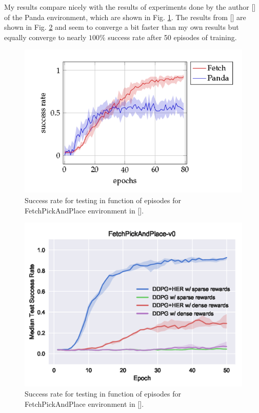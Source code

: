 \documentclass[conference]{IEEEtran}
\begin{document}
My results compare nicely with the results of experiments done by the author [\cite{gallouedec2021multi}] of the Panda environment, which are shown in Fig. \ref{fig:exp_deep_test_gallouedec}. The results from [\cite{plappert2018multi}] are shown in Fig. \ref{fig:exp_deep_test_plappert} and seem to converge a bit faster than my own results but equally converge to nearly $100\%$ success rate after 50 episodes of training.
\begin{figure}[ht]
\centering
\includegraphics[width=1.0\columnwidth]{img/exp_deep_test_gallouedec.png}
\caption{Success rate for testing in function of episodes for FetchPickAndPlace  environment in [\cite{gallouedec2021multi}].}
\label{fig:exp_deep_test_gallouedec}
\end{figure}
\begin{figure}[ht]
\centering
\includegraphics[width=0.9\columnwidth]{img/exp_deep_test_plappert.png}
\caption{Success rate for testing in function of episodes for FetchPickAndPlace  environment in [\cite{plappert2018multi}].}
\label{fig:exp_deep_test_plappert}
\end{figure}
\end{document}
